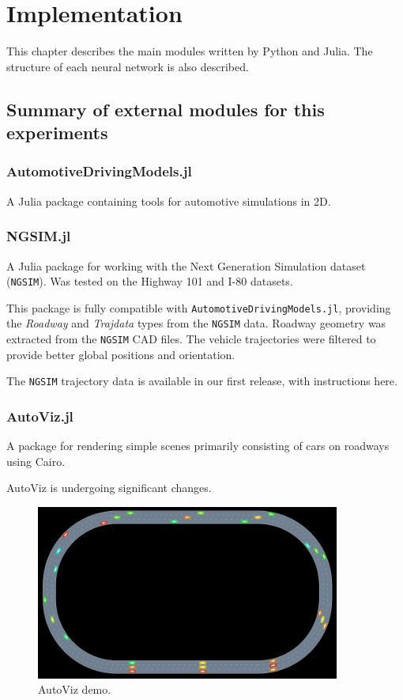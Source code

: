 \chapter{Implementation}
\label{chapter:Implementation}

This chapter describes the main modules written by Python and Julia.
The structure of each neural network is also described.


\section{Summary of external modules for this experiments}

\subsection{AutomotiveDrivingModels.jl}

A Julia package containing tools for automotive simulations in 2D.

\subsection{NGSIM.jl}

A Julia package for working with the Next Generation Simulation dataset ({\tt NGSIM}). Was tested on the Highway 101 and I-80 datasets.

This package is fully compatible with {\tt AutomotiveDrivingModels.jl}, providing the {\it Roadway} and {\it Trajdata} types from the {\tt NGSIM} data. Roadway geometry was extracted from the {\tt NGSIM} CAD files. The vehicle trajectories were filtered to provide better global positions and orientation.

The {\tt NGSIM} trajectory data is available in our first release, with instructions here.

\subsection{AutoViz.jl}

A package for rendering simple scenes primarily consisting of cars on roadways using Cairo.

AutoViz is undergoing significant changes.

\begin{figure}[H]
\begin{center}
\includegraphics[width=10cm]{./figures/readmeimage.png}
\caption{AutoViz demo.}
\label{fig:example_gridworld}
\end{center}
\end{figure}


